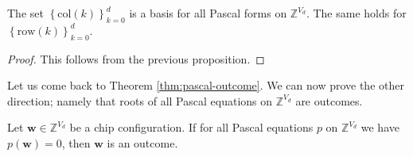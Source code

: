 \begin{corollary}\label{cor:pascal-basis-2323}
    The set \( \left\{ \mathrm{col}(k) \right\}_{k=0}^d \) is a basis for all Pascal forms on \( \mathbb{Z}^{V_d} \). The same holds for \( \left\{ \mathrm{row}(k) \right\}_{k=0}^d \). 
\end{corollary}

\begin{proof}
    This follows from the previous proposition.
\end{proof}

Let us come back to Theorem \ref{thm:pascal-outcome}. We can now prove the other direction; namely that roots of all Pascal equations on \( \mathbb{Z}^{V_d} \) are outcomes.

\begin{proposition}\label{thm:pascal-outcome-converse}
    Let \( \mathbf{w}\in \mathbb{Z}^{V_d} \) be a chip configuration. If for all Pascal equations \( p \) on \( \mathbb{Z}^{V_d} \) we have \( p(\mathbf w) = 0 \), then \( \mathbf{w} \) is an outcome.
\end{proposition}

